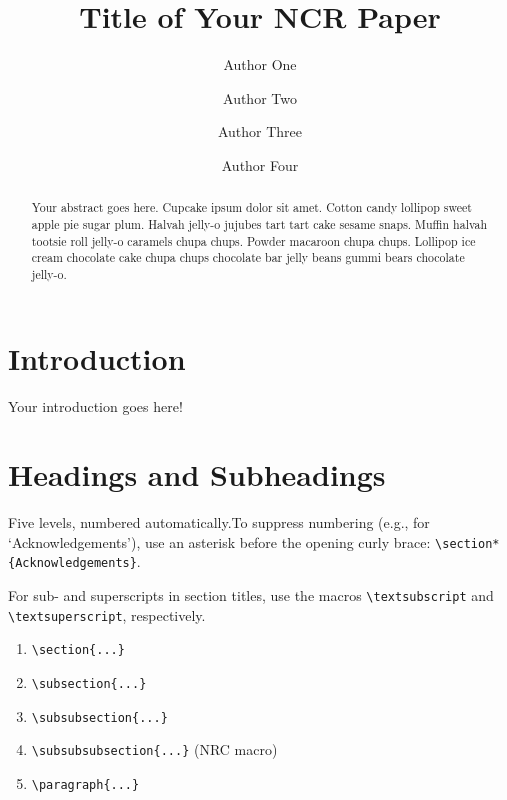 \documentclass{nrc2}
\title{Title of Your NCR Paper}
\author{Author One}
\author{Author Two}
\author[A.~Three]{Author Three}
\author{Author Four}
\begin{document}

\maketitle

\begin{abstract}
\justifying
Your abstract goes here. Cupcake ipsum dolor sit amet. Cotton candy lollipop sweet apple pie sugar plum. Halvah jelly-o jujubes tart tart cake sesame snaps. Muffin halvah tootsie roll jelly-o caramels chupa chups. Powder macaroon chupa chups. Lollipop ice cream chocolate cake chupa chups chocolate bar jelly beans gummi bears chocolate jelly-o.




\end{abstract}

\section{Introduction}

Your introduction goes here!

\section{Headings and Subheadings}
\label{sec:examples}

Five levels, numbered automatically.To suppress numbering (e.g., for `Acknowledgements'), use an asterisk before the opening curly brace: \verb|\section*{Acknowledgements}|.

For sub- and superscripts in section titles, use the macros
\verb|\textsubscript| and \verb|\textsuperscript|, respectively.

\begin{enumerate}
\item \verb|\section{...}|
\item \verb|\subsection{...}|
\item \verb|\subsubsection{...}|
\item \verb|\subsubsubsection{...}| (NRC macro)
\item \verb|\paragraph{...}|
\end{enumerate}
\end{document}
